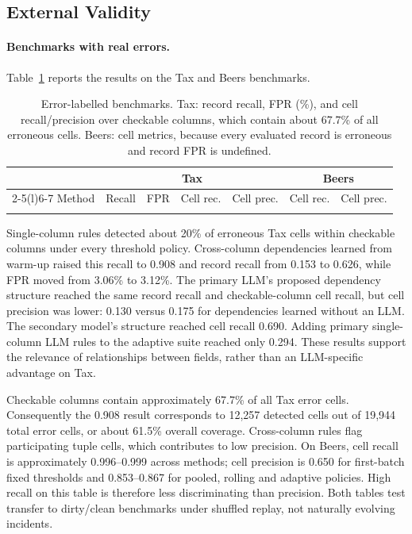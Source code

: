 \subsection{External Validity}
\label{sec:ext}

\paragraph{Benchmarks with real errors.} Table~\ref{tab:external} reports the results on the Tax and Beers benchmarks.

\begin{table}[t]
\caption{Error-labelled benchmarks. Tax: record recall, FPR (\%), and cell recall/precision over checkable columns, which contain about 67.7\% of all erroneous cells. Beers: cell metrics, because every evaluated record is erroneous and record FPR is undefined.}
\label{tab:external}
\footnotesize
\begin{tabular}{@{}lrrrrrr@{}}
\toprule
& \multicolumn{4}{c}{Tax} & \multicolumn{2}{c}{Beers} \\
\cmidrule(lr){2-5}\cmidrule(l){6-7}
Method & Recall & FPR & Cell rec. & Cell prec. & Cell rec. & Cell prec. \\
\midrule
{}{tables/external.tex}
\bottomrule
\end{tabular}
\end{table}

Single-column rules detected about 20\% of erroneous Tax cells within checkable columns under every threshold policy. Cross-column dependencies learned from warm-up raised this recall to 0.908 and record recall from 0.153 to 0.626, while FPR moved from 3.06\% to 3.12\%. The primary LLM's proposed dependency structure reached the same record recall and checkable-column cell recall, but cell precision was lower: 0.130 versus 0.175 for dependencies learned without an LLM. The secondary model's structure reached cell recall 0.690. Adding primary single-column LLM rules to the adaptive suite reached only 0.294. These results support the relevance of relationships between fields, rather than an LLM-specific advantage on Tax.

Checkable columns contain approximately 67.7\% of all Tax error cells. Consequently the 0.908 result corresponds to 12,257 detected cells out of 19,944 total error cells, or about 61.5\% overall coverage. Cross-column rules flag participating tuple cells, which contributes to low precision. On Beers, cell recall is approximately 0.996--0.999 across methods; cell precision is 0.650 for first-batch fixed thresholds and 0.853--0.867 for pooled, rolling and adaptive policies. High recall on this table is therefore less discriminating than precision. Both tables test transfer to dirty/clean benchmarks under shuffled replay, not naturally evolving incidents.

